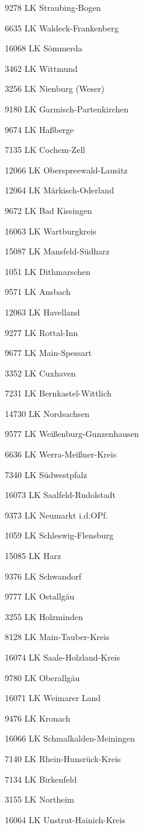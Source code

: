 9278  LK Straubing-Bogen

6635  LK Waldeck-Frankenberg

16068  LK Sömmerda

3462  LK Wittmund

3256  LK Nienburg (Weser)

9180  LK Garmisch-Partenkirchen

9674  LK Haßberge

7135  LK Cochem-Zell

12066  LK Oberspreewald-Lausitz

12064  LK Märkisch-Oderland

9672  LK Bad Kissingen

16063  LK Wartburgkreis

15087  LK Mansfeld-Südharz

1051  LK Dithmarschen

9571  LK Ansbach

12063  LK Havelland

9277  LK Rottal-Inn

9677  LK Main-Spessart

3352  LK Cuxhaven

7231  LK Bernkastel-Wittlich

14730  LK Nordsachsen

9577  LK Weißenburg-Gunzenhausen

6636  LK Werra-Meißner-Kreis

7340  LK Südwestpfalz

16073  LK Saalfeld-Rudolstadt

9373  LK Neumarkt i.d.OPf.

1059  LK Schleswig-Flensburg

15085  LK Harz

9376  LK Schwandorf

9777  LK Ostallgäu

3255  LK Holzminden

8128  LK Main-Tauber-Kreis

16074  LK Saale-Holzland-Kreis

9780  LK Oberallgäu

16071  LK Weimarer Land

9476  LK Kronach

16066  LK Schmalkalden-Meiningen

7140  LK Rhein-Hunsrück-Kreis

7134  LK Birkenfeld

3155  LK Northeim

16064  LK Unstrut-Hainich-Kreis

